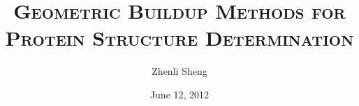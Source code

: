 
\title[Protein Structure Determination]{\textsc{Geometric Buildup Methods for Protein Structure Determination}}
\author{Zhenli Sheng}
\date{June 12, 2012}

\frame{
\titlepage
}
